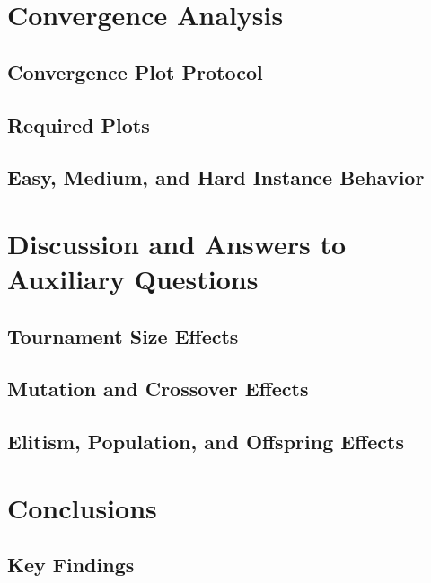 \documentclass[12pt,a4paper]{report}
\begin{document}
\chapter{Convergence Analysis}
\section{Convergence Plot Protocol}

\section{Required Plots}

\section{Easy, Medium, and Hard Instance Behavior}

\chapter{Discussion and Answers to Auxiliary Questions}
\section{Tournament Size Effects}

\section{Mutation and Crossover Effects}

\section{Elitism, Population, and Offspring Effects}

\chapter{Conclusions}
\section{Key Findings}
\end{document}
